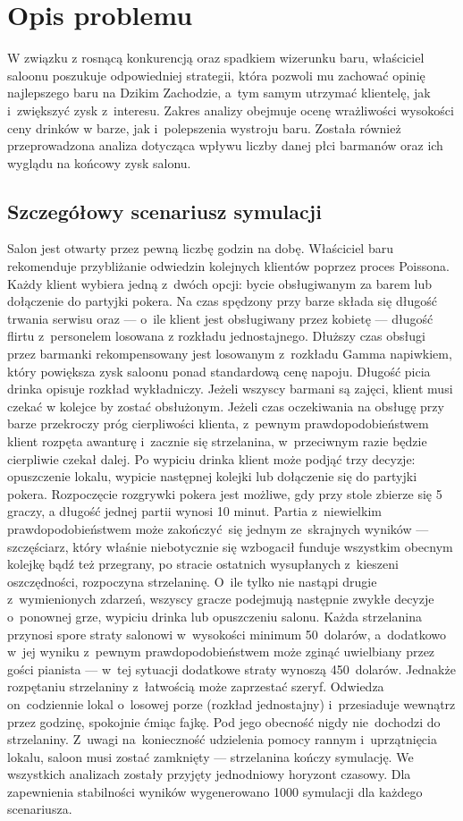 \documentclass[12pt, a4paper, oneside]{mwart} %
\begin{document}
\section{Opis problemu}
W związku z rosnącą konkurencją oraz spadkiem wizerunku baru, właściciel saloonu poszukuje odpowiedniej strategii, która pozwoli mu zachować opinię najlepszego baru na Dzikim Zachodzie, a~tym samym utrzymać klientelę, jak i~zwiększyć zysk z~interesu. Zakres analizy obejmuje ocenę wrażliwości wysokości ceny drinków w barze, jak i~polepszenia wystroju baru. Została również przeprowadzona analiza dotycząca wpływu liczby danej płci barmanów oraz ich wyglądu na końcowy zysk salonu.

\subsection{Szczegółowy scenariusz symulacji}
Salon jest otwarty przez pewną liczbę godzin na dobę. Właściciel baru rekomenduje przybliżanie odwiedzin kolejnych klientów poprzez proces Poissona. Każdy klient wybiera jedną z~dwóch opcji: bycie obsługiwanym za barem lub dołączenie do partyjki pokera. Na czas spędzony przy barze składa się długość trwania serwisu oraz --- o~ile klient jest obsługiwany przez kobietę --- długość flirtu z~personelem losowana z rozkładu jednostajnego. Dłuższy czas obsługi przez barmanki rekompensowany jest losowanym z~rozkładu Gamma napiwkiem, który powiększa zysk saloonu ponad standardową cenę napoju. Długość picia drinka opisuje rozkład wykładniczy. Jeżeli wszyscy barmani są zajęci, klient musi czekać w kolejce by zostać obsłużonym. Jeżeli czas oczekiwania na obsługę przy barze przekroczy próg cierpliwości klienta, z~pewnym prawdopodobieństwem klient rozpęta awanturę i~zacznie się strzelanina, w~przeciwnym razie będzie cierpliwie czekał dalej. Po wypiciu drinka klient może podjąć trzy decyzje: opuszczenie lokalu, wypicie następnej kolejki lub dołączenie się do partyjki pokera. Rozpoczęcie rozgrywki pokera jest możliwe, gdy przy stole zbierze się 5 graczy, a długość jednej partii wynosi 10 minut. Partia z~niewielkim prawdopodobieństwem może zakończyć~się jednym ze~skrajnych wyników --- szczęściarz, który właśnie niebotycznie się wzbogacił funduje wszystkim obecnym kolejkę bądź też przegrany, po stracie ostatnich wysupłanych z~kieszeni oszczędności, rozpoczyna strzelaninę. O~ile tylko nie nastąpi drugie z~wymienionych zdarzeń, wszyscy gracze podejmują następnie zwykłe decyzje o~ponownej grze, wypiciu drinka lub opuszczeniu salonu. Każda strzelanina przynosi spore straty salonowi w~wysokości minimum 50~dolarów, a~dodatkowo w~jej wyniku z~pewnym prawdopodobieństwem może zginąć uwielbiany przez gości pianista --- w~tej sytuacji dodatkowe straty wynoszą 450~dolarów. Jednakże rozpętaniu strzelaniny z~łatwością może zaprzestać szeryf. Odwiedza on~codziennie lokal o~losowej porze (rozkład jednostajny) i~przesiaduje wewnątrz przez godzinę, spokojnie ćmiąc fajkę. Pod jego obecność nigdy nie~dochodzi do strzelaniny. Z~uwagi na~konieczność udzielenia pomocy rannym i~uprzątnięcia lokalu, saloon musi zostać zamknięty --- strzelanina kończy symulację. We wszystkich analizach zostały przyjęty jednodniowy horyzont czasowy. Dla zapewnienia stabilności wyników wygenerowano 1000 symulacji dla każdego scenariusza.
\end{document}
